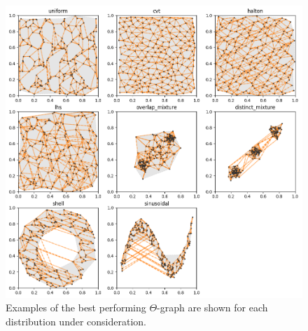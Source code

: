 \begin{figure}[htbp]
    \centering
    \includegraphics[width=\linewidth]{figs/chap7/theta_quality.png}
    \caption{Examples of the best performing $\Theta$-graph are shown for each distribution under consideration.}
    \label{fig:theta_quality}
\end{figure}

